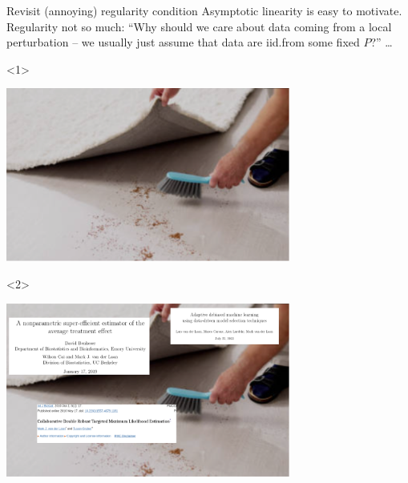 \documentclass[smaller]{beamer}\usepackage{listings}
\newcommand{\1}{\mathds{1}}
\begin{document}
\begin{frame}[label={sec:org0b99517}]{Revisit (annoying) regularity condition}
Asymptotic linearity is easy to motivate. Regularity not so much: ``Why should we
care about data coming from a local perturbation -- we usually just assume that
data are iid.\space{}from some fixed \(P\)?'' \ldots{} 

\vfill


\begin{onlyenv}<1>
\begin{center}
\includegraphics[width=0.7\textwidth]{./sweep-carpet.png}
\end{center}
\end{onlyenv}

\begin{onlyenv}<2>
\begin{center}
\includegraphics[width=0.7\textwidth]{./sweep-carpet2.png}
\end{center}
\end{onlyenv}
\end{frame}
\end{document}
